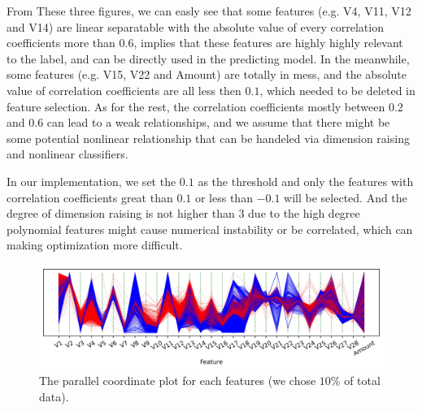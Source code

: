 \documentclass[11pt]{article}
\begin{document}
From These three figures, we can easly see that some features (e.g. V4, V11, V12 and V14) are linear separatable with the absolute value of every correlation coefficients more than $0.6$, implies that these features are highly highly relevant to the label, and can be directly used in the predicting model. In the meanwhile, some features (e.g. V15, V22 and Amount) are totally in mess, and the absolute value of correlation coefficients are all less then $0.1$, which needed to be deleted in feature selection. As for the rest, the correlation coefficients mostly between $0.2$ and $0.6$ can lead to a weak relationships, and we assume that there might be some potential nonlinear relationship that can be handeled via dimension raising and nonlinear classifiers.

In our implementation, we set the $0.1$ as the threshold and only the features with correlation coefficients great than $0.1$ or less than $-0.1$ will be selected. And the degree of dimension raising is not higher than $3$ due to the high degree polynomial features might cause numerical instability or be correlated, which can making optimization more difficult.

\begin{figure}[H]
  \centering
  \includegraphics[width=\textwidth]{../code/Task3/Analysis/PC.jpg}
  \caption{The parallel coordinate plot for each features (we chose $10\%$ of total data).}
  \label{task-3-data-distribution}
\end{figure}
\end{document}
